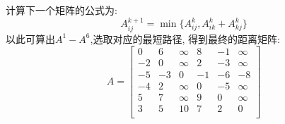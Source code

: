 \documentclass[../../main.tex]{subfiles}
\begin{document}
\begin{solution}
\begin{itemize}
        计算下一个矩阵的公式为:
        \[
        A^{k+1}_{ij} = \min \{ A^k_{ij}, A^k_{ik} + A^k_{kj} \}
        \]
        以此可算出\(A^1 - A^6\),选取对应的最短路径, 得到最终的距离矩阵:
        \[
        A =
        \begin{bmatrix}
            0& 6& \infty& 8& -1& \infty \\
            -2& 0& \infty& 2& -3& \infty \\
            -5& -3& 0& -1& -6& -8 \\
            -4& 2& \infty& 0& -5& \infty \\
            5& 7& \infty& 9& 0& \infty \\
            3& 5& 10& 7& 2& 0 \\
        \end{bmatrix}
        \]
    \end{itemize}
\end{solution}
\end{document}
